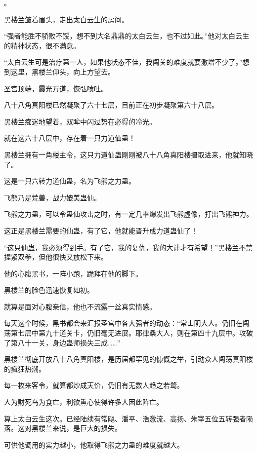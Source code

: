 
\begin{this_body}

。

黑楼兰皱着眉头，走出太白云生的房间。

“强者能胜不骄败不馁，想不到大名鼎鼎的太白云生，也不过如此。”他对太白云生的精神状态，很不满意。

“太白云生可是治疗第一人，如果他状态不佳，我闯关的难度就要激增不少了。”想到这里，黑楼兰仰头，向上方望去。

圣宫顶端，霞光万道，恢弘喷吐。

八十八角真阳楼已然凝聚了六十七层，目前正在初步凝聚第六十八层。

黑楼兰痴迷地望着，双眸中闪过势在必得的冷光。

就在这六十八层中，存在着一只力道仙蛊！

黑楼兰拥有一角楼主令，这只力道仙蛊刚刚被八十八角真阳楼摄取进来，他就知晓了。

这是一只六转力道仙蛊，名为飞熊之力蛊。

飞熊乃是荒兽，战力媲美蛊仙。

飞熊之力蛊，可以令蛊仙攻击之时，有一定几率爆发出飞熊虚像，打出飞熊神力。

这正是黑楼兰需要的仙蛊，有了它，他就能晋升成力道蛊仙了！

“这只仙蛊，我必须得到手。有了它，我的复仇，我的大计才有希望！”黑楼兰不禁捏紧双拳，但他很快又放松下来。

他的心腹黑书，一阵小跑，跪拜在他的脚下。

黑楼兰的脸色迅速恢复如初。

就算是面对心腹亲信，他也不流露一丝真实情感。

每天这个时候，黑书都会来汇报圣宫中各大强者的动态：“常山阴大人。仍旧在闯荡第七层中第九十道关卡，仍旧毫无进展。耶律桑大人，则在第四十九层中。攻破了第八十一关，身边蛊师损失三成……”

黑楼兰彻底开放八十八角真阳楼，是历届都罕见的慷慨之举，引动众人闯荡真阳楼的疯狂热潮。

每一枚来客令，就算都炒成天价，仍旧有无数人趋之若鹜。

人为财死鸟为食亡，利欲熏心使得许多人因此阵亡。

算上太白云生这次。已经陆续有常飚、潘平、浩激流、高扬、朱宰五位五转强者陨落。这对黑楼兰来说，是巨大的损失。

可供他调用的实力越小，他取得飞熊之力蛊的难度就越大。


\end{this_body}

